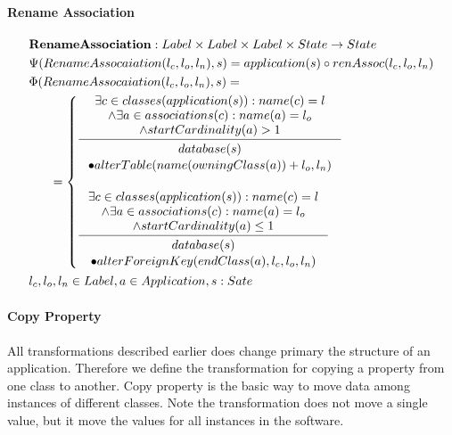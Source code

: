 \documentclass[11pt]{article}
\begin{document}
\paragraph{Rename Association}
\begin{align*}
& \mathbf{RenameAssociation} : Label \times Label \times Label \times State \rightarrow State \\
& \Psi(RenameAssocaiation(l_c, l_o, l_n), s) = application(s) \circ renAssoc(l_c, l_o, l_n)\\
& \Phi(RenameAssocaiation(l_c, l_o, l_n), s) = \\
& \;\;\;\;\;\; =\begin{cases}
	\inference{\exists c \in classes(application(s)) : name(c) = l\\ 
		\wedge \exists a \in associations(c) : name(a) = l_o 
	\\ \wedge startCardinality(a) > 1 }{\begin{gathered}
		database(s) \\ \bullet alterTable(name(owningClass(a)) + l_o, l_n)
\end{gathered}}\\ \\
  \inference{\exists c \in classes(application(s)) : name(c) = l\\ 
		\wedge \exists a \in associations(c) : name(a) = l_o 
	\\ \wedge startCardinality(a) \leq 1 }{\begin{gathered}
database(s) \\ \bullet alterForeignKey(endClass(a) ,l_c, l_o, l_n)
\end{gathered}}
 \end{cases} \\
&	l_c, l_o, l_n \in Label, a \in Application, s : Sate
\end{align*}


\paragraph{Copy Property}
All transformations described earlier does change primary the structure of an application. Therefore we define  the transformation for copying a property from one class to another. Copy property is the basic way to move data among instances of different classes. Note the transformation does not move a single value, but it move the values for all instances in the software.
\end{document}
